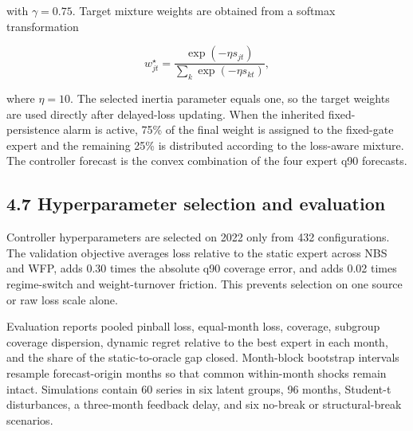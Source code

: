 with \(\gamma=0.75\). Target mixture weights are obtained from a softmax
transformation

\[
w^{\star}_{jt}=\frac{\exp(-\eta s_{jt})}{\sum_k\exp(-\eta s_{kt})},
\]

where \(\eta=10\). The selected inertia parameter equals one, so the
target weights are used directly after delayed-loss updating. When the
inherited fixed-persistence alarm is active, 75\% of the final weight is
assigned to the fixed-gate expert and the remaining 25\% is distributed
according to the loss-aware mixture. The controller forecast is the
convex combination of the four expert q90 forecasts.

\subsection{4.7 Hyperparameter selection and
evaluation}\label{hyperparameter-selection-and-evaluation}

Controller hyperparameters are selected on 2022 only from 432
configurations. The validation objective averages loss relative to the
static expert across NBS and WFP, adds 0.30 times the absolute q90
coverage error, and adds 0.02 times regime-switch and weight-turnover
friction. This prevents selection on one source or raw loss scale alone.

Evaluation reports pooled pinball loss, equal-month loss, coverage,
subgroup coverage dispersion, dynamic regret relative to the best expert
in each month, and the share of the static-to-oracle gap closed.
Month-block bootstrap intervals resample forecast-origin months so that
common within-month shocks remain intact. Simulations contain 60 series
in six latent groups, 96 months, Student-t disturbances, a three-month
feedback delay, and six no-break or structural-break scenarios.
